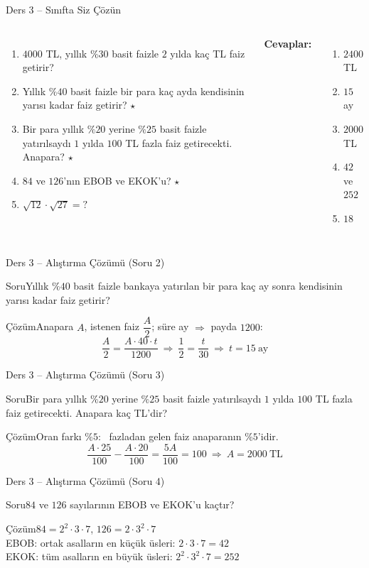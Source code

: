 \documentclass[aspectratio=169,11pt]{beamer}
\newcommand{\soru}[3]{%
\begin{frame}{#1}
  \begin{block}{Soru}\large #2\end{block}
  \pause
  \begin{exampleblock}{Çözüm}\large #3\end{exampleblock}
\end{frame}}
\begin{document}
\begin{frame}{Ders 3 -- Sınıfta Siz Çözün}
\begin{columns}[t]
\begin{enumerate}
\item \(4000\) TL, yıllık \(\%30\) basit faizle \(2\) yılda kaç TL faiz getirir?
\item Yıllık \(\%40\) basit faizle bir para kaç ayda kendisinin yarısı kadar faiz getirir? \(\star\)
\item Bir para yıllık \(\%20\) yerine \(\%25\) basit faizle yatırılsaydı \(1\) yılda \(100\) TL fazla faiz getirecekti. Anapara? \(\star\)
\item \(84\) ve \(126\)'nın EBOB ve EKOK'u? \(\star\)
\item \(\sqrt{12}\cdot\sqrt{27}=?\)
\end{enumerate}
\pause
\textbf{Cevaplar:}
\begin{enumerate}
\item \(2400\) TL
\item \(15\) ay
\item \(2000\) TL
\item \(42\) ve \(252\)
\item \(18\)
\end{enumerate}
\end{columns}
\vspace{4pt}{\footnotesize \(\star\) işaretli soruların adım adım çözümü sonraki slaytlardadır.}
\end{frame}

\soru{Ders 3 -- Alıştırma Çözümü (Soru 2)}
{Yıllık \(\%40\) basit faizle bankaya yatırılan bir para kaç ay sonra kendisinin yarısı kadar faiz getirir?}
{Anapara \(A\), istenen faiz \(\dfrac{A}{2}\); süre ay \(\Rightarrow\) payda \(1200\):
\[\frac{A}{2}=\frac{A\cdot 40\cdot t}{1200}\ \Rightarrow\ \frac{1}{2}=\frac{t}{30}\ \Rightarrow\ t=15\ \text{ay}\]}

\soru{Ders 3 -- Alıştırma Çözümü (Soru 3)}
{Bir para yıllık \(\%20\) yerine \(\%25\) basit faizle yatırılsaydı \(1\) yılda \(100\) TL fazla faiz getirecekti. Anapara kaç TL'dir?}
{Oran farkı \(\%5\): \ fazladan gelen faiz anaparanın \(\%5\)'idir.
\[\frac{A\cdot 25}{100}-\frac{A\cdot 20}{100}=\frac{5A}{100}=100\ \Rightarrow\ A=2000\ \text{TL}\]}

\soru{Ders 3 -- Alıştırma Çözümü (Soru 4)}
{\(84\) ve \(126\) sayılarının EBOB ve EKOK'u kaçtır?}
{\(84=2^2\cdot 3\cdot 7\), \qquad \(126=2\cdot 3^2\cdot 7\)\\[3pt]
EBOB: ortak asalların en küçük üsleri: \(2\cdot 3\cdot 7=42\)\\[3pt]
EKOK: tüm asalların en büyük üsleri: \(2^2\cdot 3^2\cdot 7=252\)}
\end{document}
